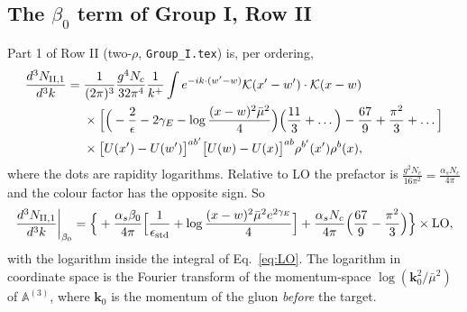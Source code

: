 \documentclass[10pt]{article}
\numberwithin{equation}{section}
\newcommand{\KK}{\mathcal K}
\newcommand{\mub}{\bar\mu}
\newcommand{\ve}{\epsilon}
\begin{document}
\subsection{The \texorpdfstring{$\beta_0$}{beta0} term of Group I, Row II}
Part 1 of Row II (two-$\rho$, \texttt{Group\_I.tex}) is, per ordering,
\begin{align}
\frac{d^3N_{\rm II,1}}{d^3k}={}&\frac{1}{(2\pi)^3}\frac{g^4N_c}{32\pi^4}\frac{1}{k^+}\int e^{-ik\cdot(w'-w)}\KK(x'-w')\cdot\KK(x-w)\notag\\
&\times\Big[\Big(-\frac2\ve-2\gamma_E-\log\frac{(x-w)^2\mub^2}{4}\Big)\Big(\frac{11}{3}+\dots\Big)-\frac{67}{9}+\frac{\pi^2}{3}+\dots\Big]\notag\\
&\times\big[U(x')-U(w')\big]^{ab'}\big[U(w)-U(x)\big]^{ab}\rho^{b'}(x')\rho^b(x),
\end{align}
where the dots are rapidity logarithms. Relative to LO the prefactor is $\frac{g^2N_c}{16\pi^2}=\frac{\alpha_sN_c}{4\pi}$ and the colour factor has the opposite sign. So
\begin{equation}
\frac{d^3N_{\rm II,1}}{d^3k}\bigg|_{\beta_0}=\Big\{+\frac{\alpha_s\beta_0}{4\pi}\Big[\frac{1}{\ve_{\rm std}}+\log\frac{(x-w)^2\mub^2e^{2\gamma_E}}{4}\Big]+\frac{\alpha_sN_c}{4\pi}\Big(\frac{67}{9}-\frac{\pi^2}{3}\Big)\Big\}\times{\rm LO},
\end{equation}
with the logarithm inside the integral of Eq.~\eqref{eq:LO}. The logarithm in coordinate space is the Fourier transform of the momentum-space $\log(\mathbf k_0^2/\mub^2)$ of $\mathbb A^{(3)}$, where $\mathbf k_0$ is the momentum of the gluon \emph{before} the target.
\end{document}
